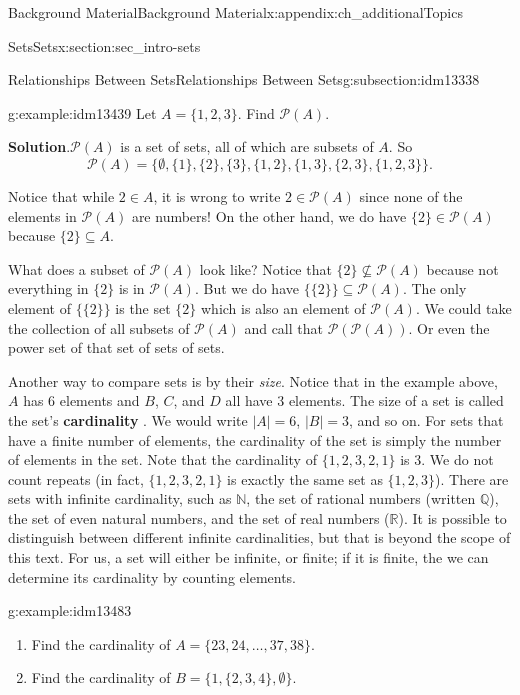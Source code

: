 \documentclass[oneside,10pt,]{book}
\newcommand{\terminology}[1]{\textbf{#1}}
\numberwithin{equation}{chapter}
\def\N{\mathbb N}
\def\pow{\mathcal P}
\begin{document}
\begin{appendixptx}{Background Material}{}{Background Material}{}{}{x:appendix:ch_additionalTopics}
\begin{sectionptx}{Sets}{}{Sets}{}{}{x:section:sec_intro-sets}
\begin{subsectionptx}{Relationships Between Sets}{}{Relationships Between Sets}{}{}{g:subsection:idm13338}
\begin{example}{}{g:example:idm13439}%
Let \(A = \{1,2,3\}\). Find \(\pow(A)\).%
\par\smallskip%
\noindent\textbf{Solution}.\hypertarget{g:solution:idm13444}{}\quad{}\(\pow(A)\) is a set of sets, all of which are subsets of \(A\). So%
\begin{equation*}
\pow(A) = \{ \emptyset, \{1\}, \{2\}, \{3\}, \{1,2\}, \{1, 3\}, \{2,3\}, \{1,2,3\}\}.
\end{equation*}
%
\par
Notice that while \(2 \in A\), it is wrong to write \(2 \in \pow(A)\) since none of the elements in \(\pow(A)\) are numbers! On the other hand, we do have \(\{2\} \in \pow(A)\) because \(\{2\} \subseteq A\).%
\par
What does a subset of \(\pow(A)\) look like? Notice that \(\{2\} \not\subseteq \pow(A)\) because not everything in \(\{2\}\) is in \(\pow(A)\). But we do have \(\{ \{2\} \} \subseteq \pow(A)\). The only element of \(\{\{2\}\}\) is the set \(\{2\}\) which is also an element of \(\pow(A)\). We could take the collection of all subsets of \(\pow(A)\) and call that \(\pow(\pow(A))\). Or even the power set of that set of sets of sets.%
\end{example}
Another way to compare sets is by their \emph{size}. Notice that in the example above, \(A\) has 6 elements and \(B\), \(C\), and \(D\) all have 3 elements. The size of a set is called the set's \terminology{cardinality} . We would write \(|A| = 6\), \(|B| = 3\), and so on. For sets that have a finite number of elements, the cardinality of the set is simply the number of elements in the set. Note that the cardinality of \(\{ 1, 2, 3, 2, 1\}\) is 3. We do not count repeats (in fact, \(\{1, 2, 3, 2, 1\}\) is exactly the same set as \(\{1, 2, 3\}\)). There are sets with infinite cardinality, such as \(\N\), the set of rational numbers (written \(\mathbb Q\)), the set of even natural numbers, and the set of real numbers (\(\mathbb R\)). It is possible to distinguish between different infinite cardinalities, but that is beyond the scope of this text. For us, a set will either be infinite, or finite; if it is finite, the we can determine its cardinality by counting elements.%
\begin{example}{}{g:example:idm13483}%
%
\begin{enumerate}
\item{}Find the cardinality of \(A = \{23, 24, \ldots, 37, 38\}\).%
\item{}Find the cardinality of \(B = \{1, \{2, 3, 4\}, \emptyset\}\).%

\end{enumerate}
\end{example}
\end{subsectionptx}
\end{sectionptx}
\end{appendixptx}
\end{document}
